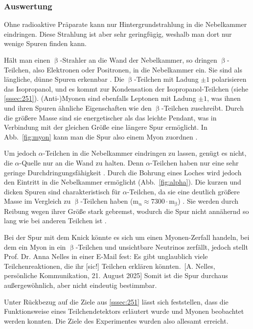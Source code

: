 \documentclass[a4paper,12pt]{article}
\newcommand{\figref}[1]{Abb.~\ref{#1}}
\begin{document}
\subsubsection{Auswertung} \label{sssec:254}

Ohne radioaktive Präparate kann nur Hintergrundstrahlung in die Nebelkammer eindringen. Diese Strahlung ist aber sehr geringfügig, weshalb man dort nur wenige Spuren finden kann. \par
Hält man einen $\upbeta$-Strahler an die Wand der Nebelkammer, so dringen $\upbeta$-Teilchen, also Elektronen oder Positronen, in die Nebelkammer ein. Sie sind als längliche, dünne Spuren erkennbar \cite[167]{Kolanoski2016}. Die $\upbeta$-Teilchen mit Ladung $\pm 1$ polarisieren das Isopropanol, und es kommt zur Kondensation der Isopropanol-Teilchen (siehe \cref{sssec:251}). (Anti-)Myonen sind ebenfalls Leptonen mit Ladung $\pm 1$, was ihnen und ihren Spuren ähnliche Eigenschaften wie den $\upbeta$-Teilchen zuschreibt. Durch die größere Masse sind sie energetischer als das leichte Pendant, was in Verbindung mit der gleichen Größe eine längere Spur ermöglicht. In \figref{fig:myon} kann man die Spur also einem Myon zuordnen \cite[vgl.][167]{Kolanoski2016}. \par
Um jedoch $\alpha$-Teilchen in die Nebelkammer eindringen zu lassen, genügt es nicht, die $\alpha$-Quelle nur an die Wand zu halten. Denn $\alpha$-Teilchen haben nur eine sehr geringe Durchdringungsfähigkeit \cite[80]{Stolz2005}. Durch die Bohrung eines Loches wird jedoch den Eintritt in die Nebelkammer ermöglicht (\figref{fig:alpha}). Die kurzen und dicken Spuren sind charakteristisch für $\alpha$-Teilchen, da sie eine deutlich größere Masse im Vergleich zu $\upbeta$-Teilchen haben ($\mathrm{m_\upalpha} \approx 7300 \cdot \mathrm{m_\upbeta}$) \cite[51]{C.C.Buchner2012}. Sie werden durch Reibung wegen ihrer Größe stark gebremst, wodurch die Spur nicht annähernd so lang wie bei anderen Teilchen ist \cite[vgl.][167]{Kolanoski2016}. \par
Bei der Spur mit dem Knick könnte es sich um einen Myonen-Zerfall handeln, bei dem ein Myon in ein $\upbeta$-Teilchen und unsichtbare Neutrinos zerfällt, jedoch stellt Prof. Dr. Anna Nelles in einer E-Mail fest: \glqq Es gibt unglaublich viele Teilchenreaktionen, die ihr [sic!] Teilchen erklären könnten.\grqq \ [A. Nelles, persönliche Kommunikation, 21. August 2025] Somit ist die Spur durchaus außergewöhnlich, aber nicht eindeutig bestimmbar. \par
Unter Rückbezug auf die Ziele aus \cref{sssec:251} lässt sich feststellen, dass die Funktionsweise eines Teilchendetektors erläutert wurde und Myonen beobachtet werden konnten. Die Ziele des Experimentes wurden also allesamt erreicht. 
\end{document}
